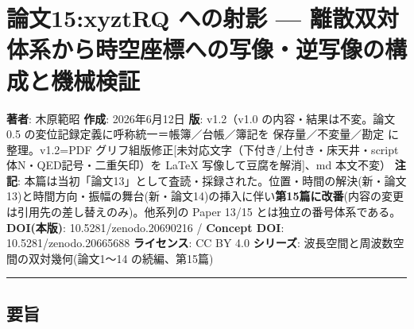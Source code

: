 \documentclass[
]{ltjsarticle}
\author{}
\date{}
\begin{document}
\section{論文15:xyztRQ への射影 ---
離散双対体系から時空座標への写像・逆写像の構成と機械検証}\label{ux8ad6ux658715xyztrq-ux3078ux306eux5c04ux5f71-ux96e2ux6563ux53ccux5bfeux4f53ux7cfbux304bux3089ux6642ux7a7aux5ea7ux6a19ux3078ux306eux5199ux50cfux9006ux5199ux50cfux306eux69cbux6210ux3068ux6a5fux68b0ux691cux8a3c}

\textbf{著者}: 木原範昭 \textbf{作成}: 2026年6月12日 \textbf{版}:
v1.2（v1.0 の内容・結果は不変。論文0.5
の変位記録定義に呼称統一＝帳簿／台帳／簿記を 保存量／不変量／勘定
に整理。v1.2=PDF
グリフ組版修正{[}未対応文字（下付き/上付き・床天井・script体N・QED記号・二重矢印）を
LaTeX 写像して豆腐を解消{]}、md 本文不変） \textbf{注記}:
本篇は当初「論文13」として査読・採録された。位置・時間の解決(新・論文13)と時間方向・振幅の舞台(新・論文14)の挿入に伴い\textbf{第15篇に改番}(内容の変更は引用先の差し替えのみ)。他系列の
Paper 13/15 とは独立の番号体系である。 \textbf{DOI(本版)}:
10.5281/zenodo.20690216 / \textbf{Concept DOI}: 10.5281/zenodo.20665688
\textbf{ライセンス}: CC BY 4.0 \textbf{シリーズ}:
波長空間と周波数空間の双対幾何(論文1〜14 の続編、第15篇)

\begin{center}\rule{0.5\linewidth}{0.5pt}\end{center}

\subsection{要旨}\label{ux8981ux65e8}
\end{document}
